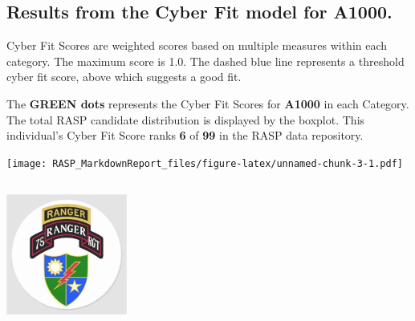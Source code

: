 \documentclass[]{article}
\begin{document}
\hypertarget{results-from-the-cyber-fit-model-for-a1000.}{%
\subsection{Results from the Cyber Fit model for
A1000.}\label{results-from-the-cyber-fit-model-for-a1000.}}

Cyber Fit Scores are weighted scores based on multiple measures within
each category. The maximum score is 1.0. The dashed blue line represents
a threshold cyber fit score, above which suggests a good fit.

The \textbf{GREEN dots} represents the Cyber Fit Scores for
\textbf{A1000} in each Category. The total RASP candidate distribution
is displayed by the boxplot. This individual's Cyber Fit Score ranks
\textbf{6} of \textbf{99} in the RASP data repository.

\texttt{[image: RASP\_MarkdownReport\_files/figure-latex/unnamed-chunk-3-1.pdf]}

\hypertarget{section}{%
\subsection{}\label{section}}

\includegraphics[width=1.5625in,height=\textheight]{RangerInsignia.jpg}
\end{document}

